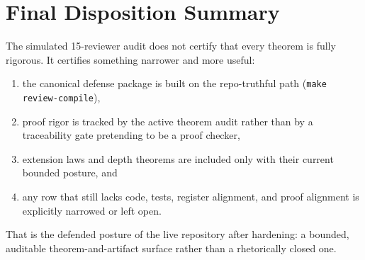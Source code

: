 \section{Final Disposition Summary}

The simulated 15-reviewer audit does not certify that every theorem is
fully rigorous.  It certifies something narrower and more useful:
\begin{enumerate}
\item the canonical defense package is built on the repo-truthful path
  (\texttt{make review-compile}),
\item proof rigor is tracked by the active theorem audit rather than by a
  traceability gate pretending to be a proof checker,
\item extension laws and depth theorems are included only with their
  current bounded posture, and
\item any row that still lacks code, tests, register alignment, and proof
  alignment is explicitly narrowed or left open.
\end{enumerate}

That is the defended posture of the live repository after hardening: a
bounded, auditable theorem-and-artifact surface rather than a rhetorically
closed one.
